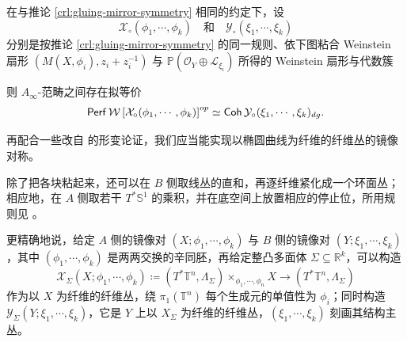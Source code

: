 \begin{crl}\label{crl:gluing-mirror-symmetry-circ}
    在与推论 \ref{crl:gluing-mirror-symmetry} 相同的约定下，设 \[
        \mathcal{X}_{\circ} (\phi_1,\dotsb,\phi_k)\quad\text{和}\quad\mathcal{Y}_{\circ} (\xi_1,\dotsb,\xi_k)
    \]分别是按推论 \ref{crl:gluing-mirror-symmetry} 的同一规则、依下图粘合 Weinstein 扇形 $(M(X,\phi_i),z_i+z_i^{-1})$ 与 $\mathbb{P} (\mathcal{O}_Y\oplus\mathcal{L}_{\xi_i})$ 所得的 Weinstein 扇形与代数簇
    \begin{center}
\end{center}
    则 $A_{\infty}$-范畴之间存在拟等价 \[
    \operatorname{\mathsf{Perf}}\mathcal{W}\left[\mathcal{X}_{\circ} (\phi_1,\dotsb,\phi_k)\right]^{op}\simeq\operatorname{\mathsf{Coh}}\mathcal{Y}_{\circ} (\xi_1,\dotsb,\xi_k)_{dg}.
\]
\end{crl}

再配合一些改自 \cite{LK17} 的形变论证，我们应当能实现以椭圆曲线为纤维的纤维丛的镜像对称。

除了把各块粘起来，还可以在 $B$ 侧取线丛的直和，再逐纤维紧化成一个环面丛；相应地，在 $A$ 侧取若干 $T^{\ast}\mathbb{S}^1$ 的乘积，并在底空间上放置相应的停止位，所用规则见 \cite{FLTZ12,Kuwagaki20}。

更精确地说，给定 $A$ 侧的镜像对 $(X;\phi_1,\dotsb ,\phi_k)$ 与 $B$ 侧的镜像对 $(Y;\xi_1,\dotsb, \xi_k)$，其中 $(\phi_1,\dotsb ,\phi_k)$ 是两两交换的辛同胚，再给定整凸多面体 $\Sigma\subseteq\mathbb{R}^k$，可以构造
\[
    \mathcal{X}_{\Sigma} (X;\phi_1,\dotsb ,\phi_k )\coloneqq\left(T^{\ast}\mathbb{T}^n,\Lambda_{\Sigma}\right)\times_{\phi_1,\dotsb ,\phi_n} X\to (T^{\ast}\mathbb{T}^n,\Lambda_{\Sigma})
\]
作为以 $X$ 为纤维的纤维丛，绕 $\pi_1(\mathbb{T}^n)$ 每个生成元的单值性为 $\phi_i$；同时构造 $\mathcal{Y}_{\Sigma} (Y;\xi_1,\dotsb ,\xi_k)$，它是 $Y$ 上以 $X_{\Sigma}$ 为纤维的纤维丛，$(\xi_1,\dotsb ,\xi_k)$ 刻画其结构主丛。

